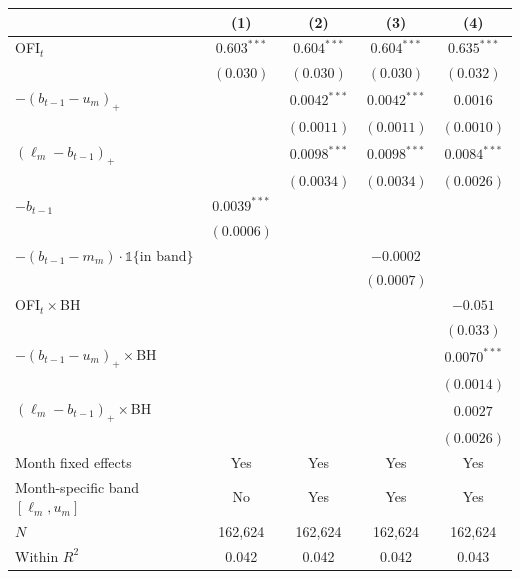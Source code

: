 \begin{tabular}{lcccc}
\toprule
 & (1) & (2) & (3) & (4) \\
\midrule
OFI$_t$ & $0.603^{***}$ & $0.604^{***}$ & $0.604^{***}$ & $0.635^{***}$ \\
 & $(0.030)$ & $(0.030)$ & $(0.030)$ & $(0.032)$ \\
$-(b_{t-1}-u_m)_+$ \;[$\kappa^+$] &  & $0.0042^{***}$ & $0.0042^{***}$ & $0.0016$ \\
 &  & $(0.0011)$ & $(0.0011)$ & $(0.0010)$ \\
$(\ell_m-b_{t-1})_+$ \;[$\kappa^-$] &  & $0.0098^{***}$ & $0.0098^{***}$ & $0.0084^{***}$ \\
 &  & $(0.0034)$ & $(0.0034)$ & $(0.0026)$ \\
$-b_{t-1}$  & $0.0039^{***}$ &  &  &  \\
 & $(0.0006)$ &  &  &  \\
$-(b_{t-1}-m_m)\cdot\mathbb 1\{\text{in band}\}$ &  &  & $-0.0002$ &  \\
 &  &  & $(0.0007)$ &  \\
OFI$_t\times$BH &  &  &  & $-0.051$ \\
 &  &  &  & $(0.033)$ \\
$-(b_{t-1}-u_m)_+\times$BH &  &  &  & $0.0070^{***}$ \\
 &  &  &  & $(0.0014)$ \\
$(\ell_m-b_{t-1})_+\times$BH &  &  &  & $0.0027$ \\
 &  &  &  & $(0.0026)$ \\
\midrule
Month fixed effects & Yes & Yes & Yes & Yes \\
Month-specific band $[\ell_m,u_m]$ & No & Yes & Yes & Yes \\
$N$ & 162,624 & 162,624 & 162,624 & 162,624 \\
Within $R^2$ & 0.042 & 0.042 & 0.042 & 0.043 \\
\bottomrule
\end{tabular}
